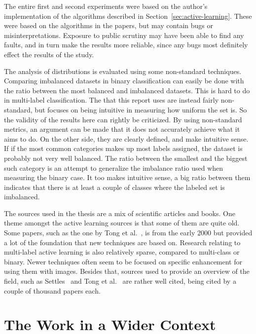 The entire first and second experiments were based on the author's implementation of the algorithms described in Section~\ref{sec:active-learning}.
These were based on the algorithms in the papers, but may contain bugs or misinterpretations.
Exposure to public scrutiny may have been able to find any faults, and in turn make the results more reliable, since any bugs most definitely effect the results of the study.

The analysis of distributions is evaluated using some non-standard techniques.
Comparing imbalanced datasets in binary classification can easily be done with the ratio between the most balanced and imbalanced datasets.
This is hard to do in multi-label classification. 
The that this report uses are instead fairly non-standard, but focuses on being intuitive in measuring how uniform the set is.
So the validity of the results here can rightly be criticized.
By using non-standard metrics, an argument can be made that it does not accurately achieve what it aims to do.
On the other side, they are clearly defined, and make intuitive sense.
If if the most common categories makes up most labels assigned, the dataset is probably not very well balanced.
The ratio between the smallest and the biggest such category is an attempt to generalize the imbalance ratio used when measuring the binary case.
It too makes intuitive sense, a big ratio between them indicates that there is at least a couple of classes where the labeled set is imbalanced.

The sources used in the thesis are a mix of scientific articles and books.
One theme amongst the active learning sources is that some of them are quite old.
Some papers, such as the one by Tong et al.~\cite{tong2001support}, is from the early 2000 but provided a lot of the foundation that new techniques are based on.
Research relating to multi-label active learning is also relatively sparse, compared to multi-class or binary.
Newer techniques often seem to be focused on specific enhancement for using them with images.
Besides that, sources used to provide an overview of the field, such as Settles~\cite{settles2012active} and Tong et al\@.~\cite{tong2001active} are rather well cited, being cited by a couple of thousand papers each.

\section{The Work in a Wider Context}